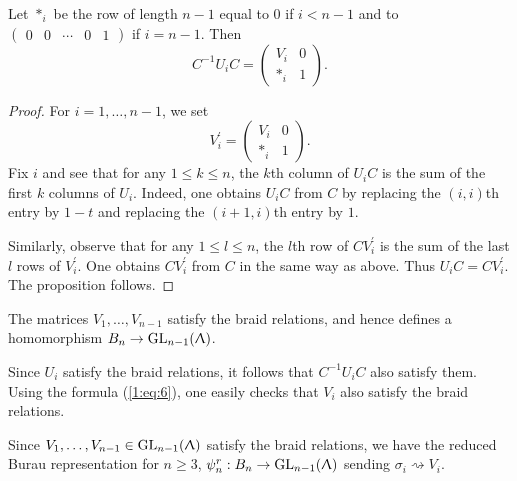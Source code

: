 \begin{proposition}
\label{sec:burau-representation}
Let $*_i$ be the row of length $n-1$ equal to $0$ if $i<n-1$ and to $\begin{pmatrix} 0 & 0 & \cdots & 0 & 1 \end{pmatrix}$ if $i = n-1$. Then 
\begin{equation}
\label{1:eq:6}
C^{-1} U_i C = \begin{pmatrix} V_i & 0 \\ *_i & 1 \end{pmatrix}.
\end{equation}
\end{proposition}

\begin{proof}
\label{sec:burau-representation-1}
For $i=1, \ldots, n-1$, we set 
\begin{equation}
  V_i^{\prime} = \begin{pmatrix} V_i & 0 \\ *_i & 1 \end{pmatrix}.
\end{equation}
Fix $i$ and see that for any $1 \leq k \leq n$, the $k$th column of $U_iC$ is the sum of the first $k$ columns of $U_i$. Indeed, one obtains $U_iC$ from $C$ by replacing the $(i,i)$th entry by $1-t$ and replacing the $(i+1, i)$th entry by $1$.

Similarly, observe that for any $1 \leq l \leq n$, the $l$th row of $CV_i^{\prime}$ is the sum of the last $l$ rows of $V_i^{\prime}$. One obtains $CV_i^{\prime}$ from $C$ in the same way as above. Thus $U_iC = CV_i^{\prime}$. The proposition follows.
\end{proof}

\begin{proposition}
\label{sec:burau-representation-9}
  The matrices $V_1, \ldots, V_{n-1}$ satisfy the braid relations, and hence defines a homomorphism $B_n \to \text{GL}_{n-1}(\Uplambda)$.
\end{proposition}

Since $U_i$ satisfy the braid relations, it follows that $C^{-1}U_iC$ also satisfy them. Using the formula (\ref{1:eq:6}), one easily checks that $V_i$ also satisfy the braid relations.

  Since $V_1, \ldots, V_{n-1} \in \text{GL}_{n-1}(\Uplambda)$ satisfy the braid relations, we have the reduced Burau representation for $n\geq 3$, $\psi_n^r : B_n \to \text{GL}_{n-1}(\Uplambda)$ sending $\sigma_i \rightsquigarrow V_i$.

